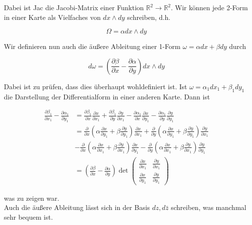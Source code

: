 \documentclass[10pt, letterpaper]{article}
\begin{document}
Dabei ist Jac die Jacobi-Matrix einer Funktion $\mathbb{R}^{2} \rightarrow \mathbb{R}^{2}$. Wir können jede 2-Form in einer Karte als Vielfaches von $d x \wedge d y$ schreiben, d.h.

$$
\Omega=\alpha d x \wedge d y
$$

Wir definieren nun auch die äußere Ableitung einer 1-Form $\omega=\alpha d x+\beta d y$ durch

$$
d \omega=\left(\frac{\partial \beta}{\partial x}-\frac{\partial \alpha}{\partial y}\right) d x \wedge d y
$$

Dabei ist zu prüfen, dass dies überhaupt wohldefiniert ist. Ist $\omega=\alpha_{1} d x_{1}+ \beta_{1} d y_{1}$ die Darstellung der Differentialform in einer anderen Karte. Dann ist

$$
\begin{aligned}
\frac{\partial \beta_{1}}{\partial x_{1}}-\frac{\partial \alpha_{1}}{\partial y_{1}} & =\frac{\partial \beta_{1}}{\partial x} \frac{\partial x}{\partial x_{1}}+\frac{\partial \beta_{1}}{\partial y} \frac{\partial y}{\partial x_{1}}-\frac{\partial \alpha_{1}}{\partial x} \frac{\partial x}{\partial y_{1}}-\frac{\partial \alpha_{1}}{\partial y} \frac{\partial y}{\partial y_{1}} \\
& =\frac{\partial}{\partial x}\left(\alpha \frac{\partial x}{\partial y_{1}}+\beta \frac{\partial y}{\partial y_{1}}\right) \frac{\partial x}{\partial x_{1}}+\frac{\partial}{\partial y}\left(\alpha \frac{\partial x}{\partial y_{1}}+\beta \frac{\partial y}{\partial y_{1}}\right) \frac{\partial y}{\partial x_{1}} \\
& -\frac{\partial}{\partial x}\left(\alpha \frac{\partial x}{\partial x_{1}}+\beta \frac{\partial y}{\partial x_{1}}\right) \frac{\partial x}{\partial y_{1}}-\frac{\partial}{\partial y}\left(\alpha \frac{\partial x}{\partial x_{1}}+\beta \frac{\partial y}{\partial x_{1}}\right) \frac{\partial y}{\partial y_{1}} \\
& =\left(\frac{\partial \beta}{\partial x}-\frac{\partial \alpha}{\partial y}\right) \operatorname{det}\left(\begin{array}{ll}
\frac{\partial x}{\partial x_{1}} & \frac{\partial y}{\partial x_{1}} \\
\frac{\partial x}{\partial y_{1}} & \frac{\partial y}{\partial y_{1}}
\end{array}\right)
\end{aligned}
$$

was zu zeigen war.\\
Auch die äußere Ableitung lässt sich in der Basis $d z, d \bar{z}$ schreiben, was manchmal sehr bequem ist.
\end{document}
